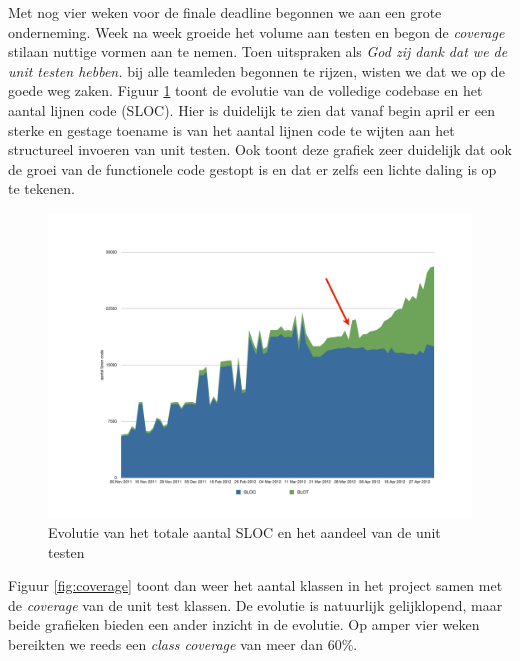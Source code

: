 \documentclass[12pt,a4paper]{report}
\begin{document}
Met nog vier weken voor de finale deadline begonnen we aan een grote onderneming. Week na week groeide het volume aan testen en begon de \emph{coverage} stilaan nuttige vormen aan te nemen. Toen uitspraken als \emph{God zij dank dat we de unit testen hebben.} bij alle teamleden begonnen te rijzen, wisten we dat we op de goede weg zaken. Figuur \ref{fig:sloc} toont de evolutie van de volledige codebase en het aantal lijnen code (SLOC). Hier is duidelijk te zien dat vanaf begin april er een sterke en gestage toename is van het aantal lijnen code te wijten aan het structureel invoeren van unit testen. Ook toont deze grafiek zeer duidelijk dat ook de groei van de functionele code gestopt is en dat er zelfs een lichte daling is op te tekenen.

\begin{figure}[htbp]
  \centering
  \includegraphics[width=125mm]{resources/sloc.pdf}
  \caption{Evolutie van het totale aantal SLOC en het aandeel van de unit testen}
  \label{fig:sloc}
\end{figure}

Figuur \ref{fig:coverage} toont dan weer het aantal klassen in het project samen met de \emph{coverage} van de unit test klassen. De evolutie is natuurlijk gelijklopend, maar beide grafieken bieden een ander inzicht in de evolutie. Op amper vier weken bereikten we reeds een \emph{class coverage} van meer dan 60\%.
\end{document}

